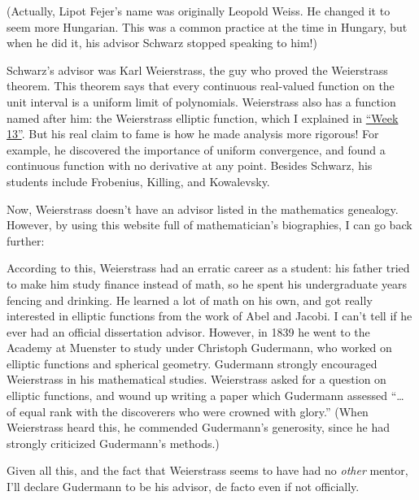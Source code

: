 \documentclass{article}
\def\tightlist{}
\renewcommand{\texttt}[1]{%
  \begingroup
  \ttfamily
  \begingroup\lccode`~=`/\lowercase{\endgroup\def~}{/\discretionary{}{}{}}%
  \begingroup\lccode`~=`[\lowercase{\endgroup\def~}{[\discretionary{}{}{}}%
  \begingroup\lccode`~=`.\lowercase{\endgroup\def~}{.\discretionary{}{}{}}%
  \catcode`/=\active\catcode`[=\active\catcode`.=\active
  \scantokens{#1\noexpand}%
  \endgroup
}
\begin{document}
(Actually, Lipot Fejer's name was originally Leopold Weiss. He changed
it to seem more Hungarian. This was a common practice at the time in
Hungary, but when he did it, his advisor Schwarz stopped speaking to
him!)

Schwarz's advisor was Karl Weierstrass, the guy who proved the
Weierstrass theorem. This theorem says that every continuous real-valued
function on the unit interval is a uniform limit of polynomials.
Weierstrass also has a function named after him: the Weierstrass
elliptic function, which I explained in
\protect\hyperlink{week13}{``Week 13''}. But his real claim to fame is
how he made analysis more rigorous! For example, he discovered the
importance of uniform convergence, and found a continuous function with
no derivative at any point. Besides Schwarz, his students include
Frobenius, Killing, and Kowalevsky.

Now, Weierstrass doesn't have an advisor listed in the mathematics
genealogy. However, by using this website full of mathematician's
biographies, I can go back further:


According to this, Weierstrass had an erratic career as a student: his
father tried to make him study finance instead of math, so he spent his
undergraduate years fencing and drinking. He learned a lot of math on
his own, and got really interested in elliptic functions from the work
of Abel and Jacobi. I can't tell if he ever had an official dissertation
advisor. However, in 1839 he went to the Academy at Muenster to study
under Christoph Gudermann, who worked on elliptic functions and
spherical geometry. Gudermann strongly encouraged Weierstrass in his
mathematical studies. Weierstrass asked for a question on elliptic
functions, and wound up writing a paper which Gudermann assessed
``\ldots{} of equal rank with the discoverers who were crowned with
glory.'' (When Weierstrass heard this, he commended Gudermann's
generosity, since he had strongly criticized Gudermann's methods.)

Given all this, and the fact that Weierstrass seems to have had no
\emph{other} mentor, I'll declare Gudermann to be his advisor, de facto
even if not officially.
\end{document}
